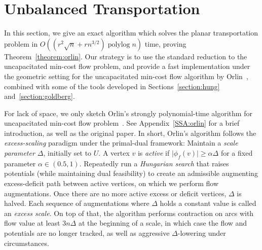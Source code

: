 \documentclass[a4paper,UKenglish]{socg-lipics-v2018}
\def\polylog{\mathop{\mathrm{polylog}}}
\def\abs#1{\mathopen| #1 \mathclose|}		%
\def\norm#1{\mathopen\| #1 \mathclose\|}	%
\def\tsupply{\lambda}
\def\fsupply{\phi}
\def\arcto{\mathord\shortrightarrow}
\def\arc#1#2{#1\arcto#2}
\def\cost{\operatorname{cost}}
\theoremstyle{plain}
\numberwithin{figure}{section}
\def\EMPH#1{\textcolor{BrickRed}{{\emph{#1}}}}
\begin{document}
\section{Unbalanced Transportation}
\label{section:orlin}

In this section, we give an exact algorithm which solves the planar transportation
problem in $O((r^2\sqrt{n} + rn^{3/2})\polylog n)$ time, proving Theorem~\ref{theorem:orlin}.
Our strategy is to use the standard reduction to the uncapacitated
min-cost flow problem, and provide a fast implementation under the geometric setting for the uncapacitated min-cost flow algorithm by Orlin~\cite{O93}, combined with some of the tools developed in Sections~\ref{section:hung} and~\ref{section:goldberg}.



For lack of space, we only sketch Orlin's strongly polynomial-time algorithm for uncapacitated min-cost flow problem~\cite{O93}.
See Appendix~\ref{SSA:orlin} for a brief introduction, as well as the original paper.
%
In short, Orlin's algorithm follows the \EMPH{excess-scaling} paradigm under the primal-dual framework:
Maintain a \EMPH{scale parameter $\Delta$}, initially set to $U$.
A vertex $v$ is \EMPH{active} if $\abs{\fsupply_f(v)} \geq \alpha\Delta$ for a fixed parameter $\alpha \in (0.5, 1)$.
Repeatedly run a \emph{Hungarian search} that raises potentials (while maintaining dual
feasibility) to create an admissible augmenting excess-deficit path between active vertices, on which
we perform flow augmentations.
Once there are no more active excess or deficit vertices, $\Delta$ is halved.
Each sequence of augmentations where $\Delta$ holds a constant value is called
an \EMPH{excess scale}.
On top of that, the algorithm performs contraction on arcs with flow value at least $3n\Delta$ at the beginning of a scale, in which case the flow and potentials are no longer tracked, as well as aggressive $\Delta$-lowering under circumstances.
\end{document}
